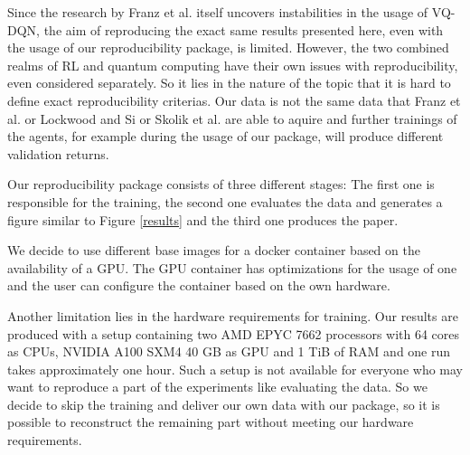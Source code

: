 Since the research by Franz et al. itself uncovers instabilities in the usage of \ac{VQ-DQN}, the aim of reproducing the exact same results presented here, even with the usage of our reproducibility package, is limited. 
However, the two combined realms of \ac{RL}\autocite{rlrepro} and quantum computing\autocite{quantumrepro} have their own issues with reproducibility, even considered separately. 
So it lies in the nature of the topic that it is hard to define exact reproducibility criterias.
Our data is not the same data that Franz et al. or Lockwood and Si or Skolik et al. are able to aquire and further trainings of the agents, for example during the usage of our package, will produce different validation returns.


Our reproducibility package consists of three different stages: The first one is responsible for the training, the second one evaluates the data and generates a figure similar to Figure \ref{results} and the third one produces the paper. 

We decide to use different base images for a docker container based on the availability of a GPU. 
The GPU container has optimizations for the usage of one and the user can configure the container based on the own hardware. 

Another limitation lies in the hardware requirements for training. 
Our results are produced with a setup containing two AMD EPYC 7662 processors with 64 cores as CPUs, NVIDIA A100 SXM4 40 GB as GPU and 1 TiB of RAM and one run takes approximately one hour. 
Such a setup is not available for everyone who may want to reproduce a part of the experiments like evaluating the data. 
So we decide to skip the training and deliver our own data with our package, so it is possible to reconstruct the remaining part without meeting our hardware requirements. 

